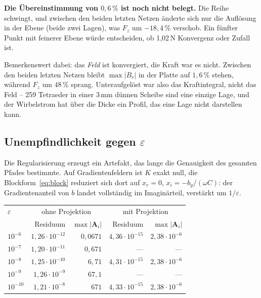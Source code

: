 \documentclass[11pt,a4paper]{article}
\newcommand{\Ai}{\mathbf{A}_i}
\begin{document}
\textbf{Die Übereinstimmung von $0{,}6\,\%$ ist noch nicht belegt.} Die Reihe
schwingt, und zwischen den beiden letzten Netzen änderte sich nur die
Auflösung in der Ebene (beide zwei Lagen), was $F_z$ um $-18{,}4\,\%$
verschob. Ein fünfter Punkt mit feinerer Ebene würde entscheiden, ob
1,02\,N Konvergenz oder Zufall ist.

Bemerkenswert dabei: das \emph{Feld} ist konvergiert, die Kraft war es nicht.
Zwischen den beiden letzten Netzen bleibt $\max|B_r|$ in der Platte auf
$1{,}6\,\%$ stehen, während $F_z$ um $48\,\%$ sprang. Unteraufgelöst war also
das Kraftintegral, nicht das Feld -- 259 Tetraeder in einer 3\,mm dünnen
Scheibe sind eine einzige Lage, und der Wirbelstrom hat über die Dicke ein
Profil, das eine Lage nicht darstellen kann.

\subsection{Unempfindlichkeit gegen \texorpdfstring{$\varepsilon$}{eps}}
\label{sec:schein}

Die Regularisierung erzeugt ein Artefakt, das lange die Genauigkeit des
gesamten Pfades bestimmte. Auf Gradientenfeldern ist $K$ exakt null, die
Blockform~\eqref{eq:block} reduziert sich dort auf $x_r = 0$,
$x_i = -b_g/(\omega C)$: der Gradientenanteil von $b$ landet vollständig im
Imaginärteil, verstärkt um $1/\varepsilon$.

\begin{center}
\begin{tabular}{lrrrr}
\toprule
$\varepsilon$ & \multicolumn{2}{c}{ohne Projektion} & \multicolumn{2}{c}{mit Projektion} \\
 & Residuum & $\max|\Ai|$ & Residuum & $\max|\Ai|$ \\
\midrule
$10^{-6}$  & $1{,}26\cdot10^{-12}$ & $0{,}0671$ & $4{,}36\cdot10^{-15}$ & $2{,}38\cdot10^{-6}$ \\
$10^{-7}$  & $1{,}20\cdot10^{-11}$ & $0{,}671$  & ---                   & --- \\
$10^{-8}$  & $1{,}25\cdot10^{-10}$ & $6{,}71$   & $4{,}31\cdot10^{-15}$ & $2{,}38\cdot10^{-6}$ \\
$10^{-9}$  & $1{,}26\cdot10^{-9}$  & $67{,}1$   & ---                   & --- \\
$10^{-10}$ & $1{,}21\cdot10^{-8}$  & $671$      & $4{,}33\cdot10^{-15}$ & $2{,}38\cdot10^{-6}$ \\
\bottomrule
\end{tabular}
\end{center}
\end{document}
